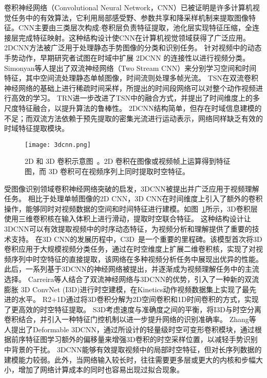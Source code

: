卷积神经网络（Convolutional Neural Network，CNN）已被证明是许多计算机视觉任务中的有效算法，它利用局部感受野、参数共享和降采样机制来提取图像特征。CNN主要由三类层次构成:卷积层负责特征提取，池化层实现特征压缩，全连接层完成特征映射。这种结构设计使CNN在计算机视觉领域获得了广泛应用。2DCNN方法被广泛用于处理静态手势图像的分类和识别任务。%
针对视频中的动态手势动作，早期研究者试图在时域中扩展 2DCNN 的连接性以进行视频分类\cite{karpathy2014large}。Simonyan等人\cite{simonyan2014twostream}提出了双流神经网络（Two Stream CNN）来分别学习空间和时间特征，其中空间流处理静态单帧图像，时间流则处理多帧光流。
TSN\cite{wang2016tsn}在双流卷积神经网络的基础上进行稀疏时间采样，所提出的时间段网络可以对整个动作视频进行高效的学习。
TRN\cite{zhou2018trn}进一步改进了TSN中的融合方式，并提出了时间维度上的多尺度特征融合，以提升算法的鲁棒性。
2DCNN结构简单，但存在时域信息建模的不足；而双流方法依赖于预先提取的密集光流进行运动表示，网络同样缺乏有效的时域特征提取模块。

\begin{figure}[htbp]
  \centering
  \texttt{[image: 3dcnn.png]}
  \caption{2D 和 3D 卷积示意图~\cite{tran2015c3d}。2D 卷积在图像或视频帧上运算得到特征图，而 3D 卷积可在视频序列上同时提取时空特征。}
  \label{fig:3dcnn}
\end{figure}

受图像识别领域卷积神经网络突破的启发，3DCNN被提出并广泛应用于视频理解任务。
相比于处理单帧图像的2D CNN，3D CNN在时间维度上引入了额外的卷积操作，能够同时对视频数据的空间和时间特征进行建模。如图~\ref{fig:3dcnn}所示，3D卷积层使用三维卷积核在输入体积上进行滑动，提取时空联合特征。
这种结构设计让3DCNN可以有效提取视频中的时序动态特征，为视频分析和理解提供了重要的技术支持。
在3D CNN的发展历程中，C3D~\cite{tran2015c3d}是一个重要的里程碑。该模型首次将3D卷积应用于大规模视频分类任务，通过在时空维度上扩展二维卷积核，实现了对视频序列中时空特征的直接提取，该网络在多种视频分析任务中展现出优异的性能。
此后，一系列基于3DCNN的神经网络被提出，并逐渐成为视频理解任务中的主流选择。
Carreira等人\cite{carreira2017i3d}结合了双流神经网络与3DCNN的优势，引入了一种新的双流膨胀 3D ConvNet (I3D)进行时空建模，在Kinetics动作视频数据集上实现了最先进的水平。
R2+1D\cite{tran2018r2+1d}通过将3D卷积分解为2D空间卷积和1D时间卷积的方式，实现了更高效的时空特征提取。
S3D\cite{xie2018s3d}考虑速度与准确度之间的平衡，将I3D与时空分离卷积结合，并引入一种特征门控机制以进一步提升网络的识别准确率。
Zhang等人提出了Deformable 3DCNN\cite{zhang2020deformable3d}，通过所设计的轻量级时空可变形卷积模块，通过根据前序特征图学习额外的偏移量来增强3D卷积的时空采样位置，以减轻手势识别中背景的干扰。
3DCNN能够有效提取视频中的局部时空特征，但对长序列数据的建模能力较弱。此外，当网络输入较长时，往往需要更多层或更大的内核和步幅大小，增加了网络计算成本的同时也容易出现过拟合现象。

